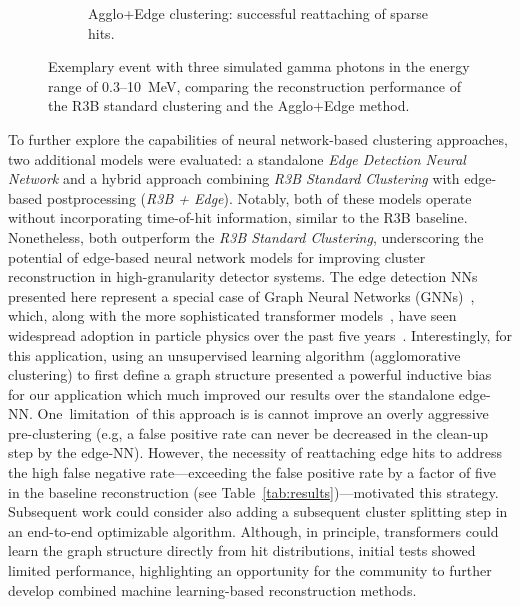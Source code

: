 \documentclass[final,5p,times,twocolumn]{elsarticle}
\begin{document}
\begin{figure}[htbp]
\begin{subfigure}[b]{0.45\textwidth}
	\centering
        \caption{Agglo+Edge clustering: successful reattaching of sparse hits.}
        \label{fig:subfig2}
    \end{subfigure}
    \caption{Exemplary event with three simulated gamma photons in the energy range of 0.3–10~MeV, comparing the reconstruction performance of the R3B standard clustering and the Agglo+Edge method.}
    \label{fig:comparison_r3b_agglo_edge}
\end{figure}

To further explore the capabilities of neural network-based clustering approaches, two additional models were evaluated: a standalone \textit{Edge Detection Neural Network} and a hybrid approach combining \textit{R3B Standard Clustering} with edge-based postprocessing (\textit{R3B + Edge}). Notably, both of these models operate without incorporating time-of-hit information, similar to the R3B baseline. Nonetheless, both outperform the \textit{R3B Standard Clustering}, underscoring the potential of edge-based neural network models for improving cluster reconstruction in high-granularity detector systems.\newline
The edge detection NNs presented here represent a special case of Graph Neural Networks (GNNs)~\cite{battaglia2018relational}, which, along with the more sophisticated transformer models~\cite{vaswani2017attention,amatriain2023transformer}, have seen widespread adoption in particle physics over the past five years~\cite{dezoort2021charged,ju2021performance,van2024transformers}. Interestingly, for this application, using an unsupervised learning algorithm (agglomorative clustering) to first define a graph structure presented a powerful inductive bias for our application which much improved our results over the standalone edge-NN. One limitation of this approach is is cannot improve an overly aggressive pre-clustering (e.g, a false positive rate can never be decreased  in the clean-up step by the edge-NN). However, the necessity of reattaching edge hits to address the high false negative rate—exceeding the false positive rate by a factor of five in the baseline reconstruction (see Table~\ref{tab:results})—motivated this strategy.\newline
Subsequent work could consider also adding a subsequent cluster splitting step in an end-to-end optimizable algorithm.\newline
Although, in principle, transformers could learn the graph structure directly from hit distributions, initial tests showed limited performance, highlighting an opportunity for the community to further develop combined machine learning-based reconstruction methods.\newline
\end{document}
